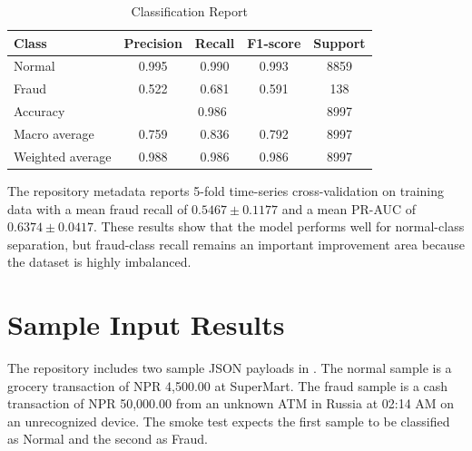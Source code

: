 \documentclass[12pt,a4paper]{report}
\begin{document}
\begin{table}[H]
\centering
\caption{Classification Report}
\begin{tabular}{|l|c|c|c|c|}
\hline
\textbf{Class} & \textbf{Precision} & \textbf{Recall} & \textbf{F1-score} & \textbf{Support} \\ \hline
Normal & 0.995 & 0.990 & 0.993 & 8859 \\ \hline
Fraud & 0.522 & 0.681 & 0.591 & 138 \\ \hline
Accuracy & \multicolumn{3}{c|}{0.986} & 8997 \\ \hline
Macro average & 0.759 & 0.836 & 0.792 & 8997 \\ \hline
Weighted average & 0.988 & 0.986 & 0.986 & 8997 \\ \hline
\end{tabular}
\end{table}

The repository metadata reports 5-fold time-series cross-validation on training data with a mean fraud recall of \(0.5467 \pm 0.1177\) and a mean PR-AUC of \(0.6374 \pm 0.0417\). These results show that the model performs well for normal-class separation, but fraud-class recall remains an important improvement area because the dataset is highly imbalanced.

\section{Sample Input Results}
The repository includes two sample JSON payloads in . The normal sample is a grocery transaction of NPR 4,500.00 at SuperMart. The fraud sample is a cash transaction of NPR 50,000.00 from an unknown ATM in Russia at 02:14 AM on an unrecognized device. The smoke test expects the first sample to be classified as Normal and the second as Fraud.
\end{document}
